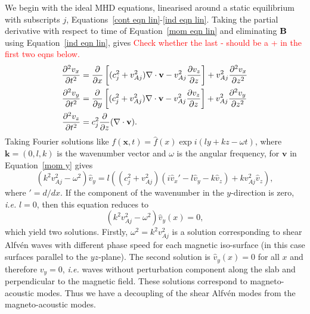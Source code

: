 \documentclass[12pt]{../style-files/ociamthesis}
\begin{document}
We begin with the ideal MHD equations, linearised around a static equilibrium with subscripts $j$, Equations~\eqref{cont eqn lin}-\eqref{ind eqn lin}. Taking the partial derivative with respect to time of Equation~\eqref{mom eqn lin} and eliminating $\mathbf{B}$ using Equation~\eqref{ind eqn lin}, gives \textcolor{red}{Check whether the last - should be a + in the first two eqns below.}
\begin{align}
	\frac{\partial^2 v_x}{\partial t^2} &= \frac{\partial}{\partial x}\left[ (c_j^2 + v_{Aj}^2)\nabla\cdot\mathbf{v} - v_{Aj}^2\frac{\partial v_z}{\partial z} \right] + v_{Aj}^2 \frac{\partial^2 v_x}{\partial z^2} \label{mom x} \\
	\frac{\partial^2 v_y}{\partial t^2} &= \frac{\partial}{\partial y}\left[ (c_j^2 + v_{Aj}^2)\nabla\cdot\mathbf{v} - v_{Aj}^2\frac{\partial v_z}{\partial z} \right] + v_{Aj}^2 \frac{\partial^2 v_y}{\partial z^2} \label{mom y} \\
	\frac{\partial^2 v_z}{\partial t^2} &= c_j^2\frac{\partial}{\partial z}(\nabla\cdot\mathbf{v}). \label{mom z}
\end{align}
Taking Fourier solutions like $f(\mathbf{x},t) = \hat{f}(x) \exp{i(ly + kz - \omega t)}$, where $\mathbf{k} = (0, l, k)$ is the wavenumber vector and $\omega$ is the angular frequency, for $\mathbf{v}$ in Equation~\eqref{mom y} gives
\begin{equation}
(k^2v_{Aj}^2 - \omega^2)\hat{v}_y = l((c_j^2 + v_{Aj}^2)(i\hat{v}_x' - l\hat{v}_y - k\hat{v}_z) + kv_{Aj}^2\hat{v}_z),
\end{equation}
where $' = d/dx$. If the component of the wavenumber in the $y$-direction is zero, \textit{i.e.} $l = 0$, then this equation reduces to
\begin{equation}
(k^2v_{Aj}^2 - \omega^2)\hat{v}_y(x) = 0,
\end{equation}
which yield two solutions. Firstly, $\omega^2 = k^2v_{Aj}^2$ is a solution corresponding to shear Alfv\'{e}n waves with different phase speed for each magnetic iso-surface (in this case surfaces parallel to the $yz$-plane). The second solution is $\hat{v}_y(x) = 0$ for all $x$ and therefore $v_y = 0$, \textit{i.e.} waves without perturbation component along the slab and perpendicular to the magnetic field. These solutions correspond to magneto-acoustic modes. Thus we have a decoupling of the shear Alfv\'{e}n modes from the magneto-acoustic modes.
\end{document}
